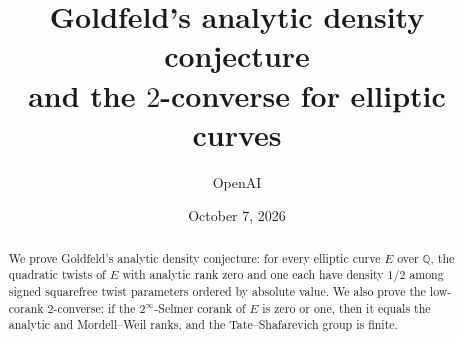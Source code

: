 \documentclass[11pt]{article}
\title{Goldfeld's analytic density conjecture\\and the $2$-converse for elliptic curves}
\author{OpenAI}
\date{October 7, 2026}
\theoremstyle{definition}
\theoremstyle{remark}
\newcommand{\Q}{\mathbb Q}
\theoremstyle{definition}
\numberwithin{equation}{section}
\begin{document}
\maketitle
\begin{abstract}
We prove Goldfeld's analytic density conjecture: for every elliptic curve
$E$ over $\Q$, the quadratic twists of $E$ with analytic rank zero and one
each have density $1/2$ among signed squarefree twist parameters ordered by
absolute value. We also prove the low-corank $2$-converse: if the
$2^\infty$-Selmer corank of $E$ is zero or one, then it equals the analytic
and Mordell--Weil ranks, and the Tate--Shafarevich group is finite.
\end{abstract}
\tableofcontents
\clearpage
















\end{document}
